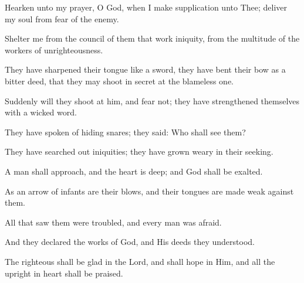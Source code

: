 Hearken unto my prayer, O God, when I make supplication unto Thee; deliver my soul from fear of the enemy.

Shelter me from the council of them that work iniquity, from the multitude of the workers of unrighteousness.

They have sharpened their tongue like a sword, they have bent their bow as a bitter deed, that they may shoot in secret at the blameless one.

Suddenly will they shoot at him, and fear not; they have strengthened themselves with a wicked word.

They have spoken of hiding snares; they said: Who shall see them?

They have searched out iniquities; they have grown weary in their seeking.

A man shall approach, and the heart is deep; and God shall be exalted.

As an arrow of infants are their blows, and their tongues are made weak against them.

All that saw them were troubled, and every man was afraid.

And they declared the works of God, and His deeds they understood.

The righteous shall be glad in the Lord, and shall hope in Him, and all the upright in heart shall be praised.
